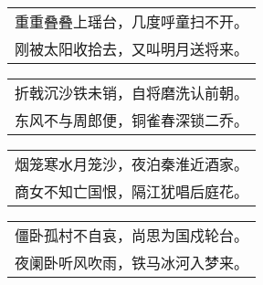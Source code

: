 \nopagebreak%
\nopagebreak%
\noindent\begin{minipage}{\linewidth}
  \vskip-3pt\begin{table}[H]
    \centering
    \begin{tabular}{@{}l@{}}
重重叠叠上瑶台，几度呼童扫不开。\\
刚被太阳收拾去，又叫明月送将来。
    \end{tabular}
  \end{table}
\end{minipage}
\vspace{1cm}


\nopagebreak%
\nopagebreak%
\noindent\begin{minipage}{\linewidth}
  \vskip-3pt\begin{table}[H]
    \centering
    \begin{tabular}{@{}l@{}}
折戟沉沙铁未销，自将磨洗认前朝。\\
东风不与周郎便，铜雀春深锁二乔。
    \end{tabular}
  \end{table}
\end{minipage}
\vspace{1cm}


\nopagebreak%
\nopagebreak%
\noindent\begin{minipage}{\linewidth}
  \vskip-3pt\begin{table}[H]
    \centering
    \begin{tabular}{@{}l@{}}
烟笼寒水月笼沙，夜泊秦淮近酒家。\\
商女不知亡国恨，隔江犹唱后庭花。
    \end{tabular}
  \end{table}
\end{minipage}
\vspace{1cm}


\nopagebreak%
\nopagebreak%
\noindent\begin{minipage}{\linewidth}
  \vskip-3pt\begin{table}[H]
    \centering
    \begin{tabular}{@{}l@{}}
僵卧孤村不自哀，尚思为国戍轮台。\\
夜阑卧听风吹雨，铁马冰河入梦来。
    \end{tabular}
  \end{table}
\end{minipage}
\vspace{1cm}


